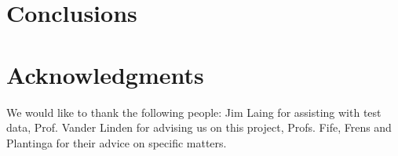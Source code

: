 \documentclass{acm_proc_article-sp}
\begin{document}
\section{Conclusions}


\section{Acknowledgments}
We would like to thank the following people:  Jim Laing for assisting with test data, Prof. Vander Linden for advising us on this project, Profs. Fife, Frens and Plantinga for their advice on specific matters.

%

  
%
%

\balancecolumns

\end{document}
